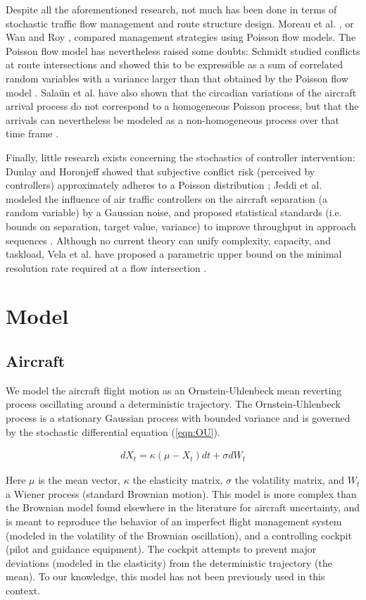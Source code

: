 \documentclass[conference]{IEEEtran}
\begin{document}
Despite all the aforementioned research, not much has been done in terms of stochastic traffic flow management and route structure design. Moreau et al. \cite{moreau2005}, or Wan and Roy \cite{Wan09}, compared management strategies using Poisson flow models. The Poisson flow model has nevertheless raised some doubts: Schmidt studied conflicts at route intersections and showed this to be expressible as a sum of correlated random variables with a variance larger than that obtained by the Poisson flow model \cite{Sch77}. Sala\"{u}n et al. have also shown that the circadian variations of the aircraft arrival process do not correspond to a homogeneous Poisson process, but that the arrivals can nevertheless be modeled as a non-homogeneous process over that time frame \cite{Sal10}.

Finally, little research exists concerning the stochastics of controller intervention: Dunlay and Horonjeff showed that subjective conflict risk (perceived by controllers) approximately adheres to a Poisson distribution \cite{Dun75}; Jeddi et al. modeled the influence of air traffic controllers on the aircraft separation (a random variable) by a Gaussian noise, and proposed statistical standards (i.e. bounds on separation, target value, variance) to improve throughput in approach sequences \cite{Jed08}. Although no current theory can unify complexity, capacity, and taskload, Vela et al. have proposed a parametric upper bound on the minimal resolution rate required at a flow intersection \cite{Vel10}.

\section{Model}
\label{sec:model}

\subsection{Aircraft}
We model the aircraft flight motion as an Ornstein-Uhlenbeck mean reverting process oscillating around a deterministic trajectory. The Ornstein-Uhlenbeck process is a stationary Gaussian process with bounded variance and is governed by the stochastic differential equation (\ref{eqn:OU}).

\begin{align}
dX_t=\kappa(\mu-X_t)dt+\sigma dW_t 
\label{eqn:OU}
\end{align}

Here $\mu$ is the mean vector, $\kappa$ the elasticity matrix, $\sigma$ the volatility matrix, and $W_t$ a Wiener process (standard Brownian motion). This model is more complex than the Brownian model found elsewhere in the literature for aircraft uncertainty, and is meant to reproduce the behavior of an imperfect flight management system (modeled in the volatility of the Brownian oscillation), and a controlling cockpit (pilot and guidance equipment). The cockpit attempts to prevent major deviations (modeled in the elasticity) from the deterministic trajectory (the mean). To our knowledge, this model has not been previously used in this context. 
\end{document}
